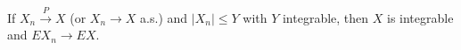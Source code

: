 If $X_n \xrightarrow{P} X$ (or $X_n \to X$ a.s.) and $|X_n| \leq Y$ with $Y$ integrable, then $X$ is integrable and $E X_n \to E X$.
